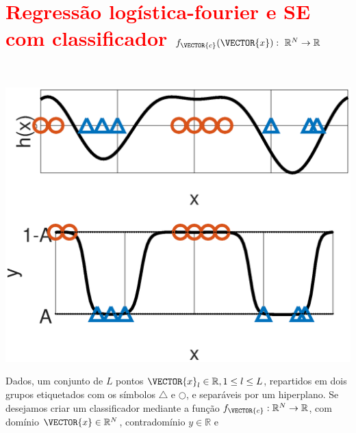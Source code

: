 \newpage


\section{\textcolor{red}{Regressão logística-fourier e SE com classificador $f_{\VECTOR{c}}(\VECTOR{x}):~\mathbb{R}^{N} \rightarrow \mathbb{R}$}}
\label{sec:theo:reglogrnr1fourier:1}


\begin{theorem}\label{theo:reglogrnr1fourier:1}
~\\
\noindent
\begin{minipage}{0.45\textwidth}
\centering
\includegraphics[width=0.95\linewidth]{chapters/classificacao/mfiles/reglogrnr1fourier/reglogrnr1fourier.eps} 
\end{minipage}
\begin{minipage}{0.55\textwidth}
Dados, um conjunto de $L$ pontos $\VECTOR{x}_l \in \mathbb{R}, 1 \leq l \leq L$,
repartidos em dois grupos etiquetados com os símbolos $\bigtriangleup$ e $\bigcirc$, 
e separáveis por um hiperplano.
Se desejamos criar um classificador mediante 
a função  $f_{\VECTOR{c}}:\mathbb{R}^{N} \rightarrow \mathbb{R}$,
com domínio $\VECTOR{x} \in \mathbb{R}^{N}$, contradomínio $y \in \mathbb{R}$ e 

\end{minipage}
\end{theorem}
